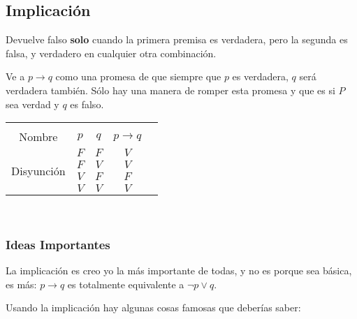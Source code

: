 \documentclass[12pt]{report}                                    %
\begin{document}
            \clearpage
            \subsection{Implicación}

                Devuelve falso \textbf{solo} cuando la primera premisa es verdadera, pero la 
                segunda es falsa, y verdadero en cualquier otra combinación.

                Ve a $p \to q$ como una promesa de que siempre que $p$ es verdadera, $q$ será verdadera también.
                Sólo hay una manera de romper esta promesa y que es si $P$ sea verdad y $q$ es falso.\\


                \begin{tabular}{ |c|c|c|c|c| } 
                    \hline &&&\\
                    \large{Nombre} & $p$ & $q$ & $p \to q$ \\[0.5em]
                    \hline
                    \multirow{4}{5em}{Disyunción}
                    & $F$ & $F$ & $V$ \\ \cline{2-4}
                    & $F$ & $V$ & $V$ \\ \cline{2-4}
                    & $V$ & $F$ & $F$ \\ \cline{2-4}
                    & $V$ & $V$ & $V$ \\ 
                    \hline
                \end{tabular}\\[1.0em]

                \subsubsection*{Ideas Importantes}

                    La implicación es creo yo la más importante de todas, y no es porque sea básica, 
                    es más: $p \to q$ es totalmente equivalente a $\lnot p \lor q$.

                    Usando la implicación hay algunas cosas famosas que deberías saber:
\end{document}
